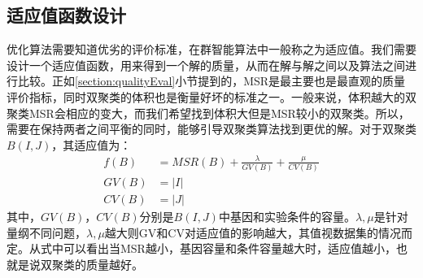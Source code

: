    \subsection{适应值函数设计}\label{sec:fitness}
    优化算法需要知道优劣的评价标准，在群智能算法中一般称之为适应值。我们需要设计一个适应值函数，用来得到一个解的质量，从而在解与解之间以及算法之间进行比较。正如\ref{section:qualityEval}小节提到的，MSR是最主要也是最直观的质量评价指标，同时双聚类的体积也是衡量好坏的标准之一。一般来说，体积越大的双聚类MSR会相应的变大，而我们希望找到体积大但是MSR较小的双聚类。所以，需要在保持两者之间平衡的同时，能够引导双聚类算法找到更优的解。对于双聚类$B(I,J)$，其适应值为：
    \begin{align}
      f(B) &= MSR(B) + \frac{\lambda}{GV(B)} +\frac{\mu}{CV(B)} \\
      GV(B) & = |I| \\
      CV(B) & = |J|
    \end{align}
    其中，$GV(B)$，$CV(B)$分别是$B(I,J)$中基因和实验条件的容量。$\lambda,\mu$是针对量纲不同问题，$\lambda,\mu$越大则GV和CV对适应值的影响越大，其值视数据集的情况而定。从式中可以看出当MSR越小，基因容量和条件容量越大时，适应值越小，也就是说双聚类的质量越好。
    
